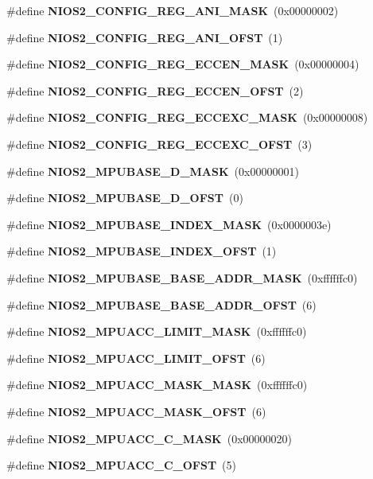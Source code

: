 \begin{DoxyCompactItemize}
\item 
\#define {\bf N\+I\+O\+S2\+\_\+\+C\+O\+N\+F\+I\+G\+\_\+\+R\+E\+G\+\_\+\+A\+N\+I\+\_\+\+M\+A\+SK}~(0x00000002)
\item 
\#define {\bf N\+I\+O\+S2\+\_\+\+C\+O\+N\+F\+I\+G\+\_\+\+R\+E\+G\+\_\+\+A\+N\+I\+\_\+\+O\+F\+ST}~(1)
\item 
\#define {\bf N\+I\+O\+S2\+\_\+\+C\+O\+N\+F\+I\+G\+\_\+\+R\+E\+G\+\_\+\+E\+C\+C\+E\+N\+\_\+\+M\+A\+SK}~(0x00000004)
\item 
\#define {\bf N\+I\+O\+S2\+\_\+\+C\+O\+N\+F\+I\+G\+\_\+\+R\+E\+G\+\_\+\+E\+C\+C\+E\+N\+\_\+\+O\+F\+ST}~(2)
\item 
\#define {\bf N\+I\+O\+S2\+\_\+\+C\+O\+N\+F\+I\+G\+\_\+\+R\+E\+G\+\_\+\+E\+C\+C\+E\+X\+C\+\_\+\+M\+A\+SK}~(0x00000008)
\item 
\#define {\bf N\+I\+O\+S2\+\_\+\+C\+O\+N\+F\+I\+G\+\_\+\+R\+E\+G\+\_\+\+E\+C\+C\+E\+X\+C\+\_\+\+O\+F\+ST}~(3)
\item 
\#define {\bf N\+I\+O\+S2\+\_\+\+M\+P\+U\+B\+A\+S\+E\+\_\+\+D\+\_\+\+M\+A\+SK}~(0x00000001)
\item 
\#define {\bf N\+I\+O\+S2\+\_\+\+M\+P\+U\+B\+A\+S\+E\+\_\+\+D\+\_\+\+O\+F\+ST}~(0)
\item 
\#define {\bf N\+I\+O\+S2\+\_\+\+M\+P\+U\+B\+A\+S\+E\+\_\+\+I\+N\+D\+E\+X\+\_\+\+M\+A\+SK}~(0x0000003e)
\item 
\#define {\bf N\+I\+O\+S2\+\_\+\+M\+P\+U\+B\+A\+S\+E\+\_\+\+I\+N\+D\+E\+X\+\_\+\+O\+F\+ST}~(1)
\item 
\#define {\bf N\+I\+O\+S2\+\_\+\+M\+P\+U\+B\+A\+S\+E\+\_\+\+B\+A\+S\+E\+\_\+\+A\+D\+D\+R\+\_\+\+M\+A\+SK}~(0xffffffc0)
\item 
\#define {\bf N\+I\+O\+S2\+\_\+\+M\+P\+U\+B\+A\+S\+E\+\_\+\+B\+A\+S\+E\+\_\+\+A\+D\+D\+R\+\_\+\+O\+F\+ST}~(6)
\item 
\#define {\bf N\+I\+O\+S2\+\_\+\+M\+P\+U\+A\+C\+C\+\_\+\+L\+I\+M\+I\+T\+\_\+\+M\+A\+SK}~(0xffffffc0)
\item 
\#define {\bf N\+I\+O\+S2\+\_\+\+M\+P\+U\+A\+C\+C\+\_\+\+L\+I\+M\+I\+T\+\_\+\+O\+F\+ST}~(6)
\item 
\#define {\bf N\+I\+O\+S2\+\_\+\+M\+P\+U\+A\+C\+C\+\_\+\+M\+A\+S\+K\+\_\+\+M\+A\+SK}~(0xffffffc0)
\item 
\#define {\bf N\+I\+O\+S2\+\_\+\+M\+P\+U\+A\+C\+C\+\_\+\+M\+A\+S\+K\+\_\+\+O\+F\+ST}~(6)
\item 
\#define {\bf N\+I\+O\+S2\+\_\+\+M\+P\+U\+A\+C\+C\+\_\+\+C\+\_\+\+M\+A\+SK}~(0x00000020)
\item 
\#define {\bf N\+I\+O\+S2\+\_\+\+M\+P\+U\+A\+C\+C\+\_\+\+C\+\_\+\+O\+F\+ST}~(5)

\end{DoxyCompactItemize}
